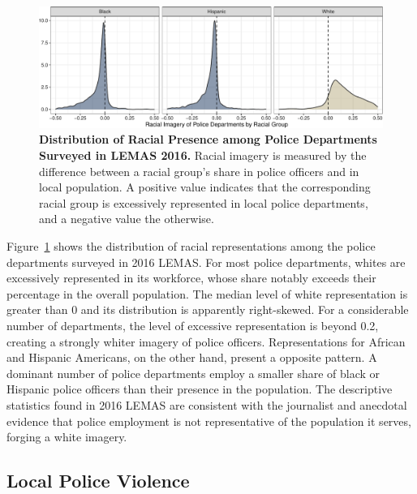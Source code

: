 \documentclass[
  12pt,
]{article}
\begin{document}
\begin{figure}[tb]

{\centering \includegraphics{racialized-police_files/figure-pdf/fig-lemas-density-1.pdf}

}

\caption{\label{fig-lemas-density}\textbf{Distribution of Racial
Presence among Police Departments Surveyed in LEMAS 2016.} Racial
imagery is measured by the difference between a racial group's share in
police officers and in local population. A positive value indicates that
the corresponding racial group is excessively represented in local
police departments, and a negative value the otherwise.}

\end{figure}

Figure~\ref{fig-lemas-density} shows the distribution of racial
representations among the police departments surveyed in 2016 LEMAS. For
most police departments, whites are excessively represented in its
workforce, whose share notably exceeds their percentage in the overall
population. The median level of white representation is greater than 0
and its distribution is apparently right-skewed. For a considerable
number of departments, the level of excessive representation is beyond
0.2, creating a strongly whiter imagery of police officers.
Representations for African and Hispanic Americans, on the other hand,
present a opposite pattern. A dominant number of police departments
employ a smaller share of black or Hispanic police officers than their
presence in the population. The descriptive statistics found in 2016
LEMAS are consistent with the journalist and anecdotal evidence that
police employment is not representative of the population it serves,
forging a white imagery.

\hypertarget{local-police-violence}{%
\subsection{Local Police Violence}\label{local-police-violence}}
\end{document}
